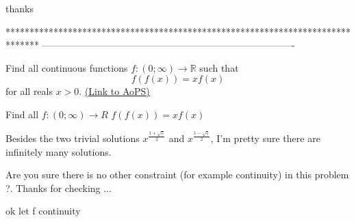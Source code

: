 \begin{solution}
	thanks  
\end{solution}
*******************************************************************************
-------------------------------------------------------------------------------

\begin{problem}
	Find all continuous functions $ f: (0; \infty ) \to \mathbb R$ such that
\[f(f(x)) = x f(x)\]
for all reals $x>0$.
	\flushright \href{https://artofproblemsolving.com/community/c6h314046}{(Link to AoPS)}
\end{problem}



\begin{solution}
	\begin{tcolorbox}Find all $ f: (0; \infty ) \rightarrow R$
$ f(f(x)) = x f(x)$\end{tcolorbox}

Besides the two trivial solutions $ x^{\frac{1+\sqrt 5}2}$ and $ x^{\frac{1-\sqrt 5}2}$, I'm pretty sure there are infinitely many solutions.

Are you sure there is no other constraint (for example continuity) in this problem ?.
Thanks for checking ...
\end{solution}



\begin{solution}
	ok let f continuity
\end{solution}



